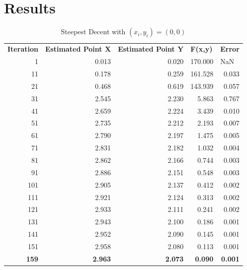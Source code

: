 \documentclass[12pt]{article}
\begin{document}
\section{Results}
\begin{table}[h!]
  \centering
  \caption{Steepest Decent with $(x_i,y_i) = (0,0)$}
    \begin{tabular}{rrrrr}
    \multicolumn{1}{l}{\textbf{Iteration}} & \multicolumn{1}{l}{\textbf{Estimated Point X}} & \multicolumn{1}{l}{\textbf{Estimated Point Y}} & \multicolumn{1}{l}{\textbf{F(x,y)}} & \multicolumn{1}{l}{\textbf{Error}} \\
    1     & 0.013 & 0.020 & 170.000 & \multicolumn{1}{l}{NaN} \\
    11    & 0.178 & 0.259 & 161.528 & 0.033 \\
    21    & 0.468 & 0.619 & 143.939 & 0.057 \\
    31    & 2.545 & 2.230 & 5.863 & 0.767 \\
    41    & 2.659 & 2.224 & 3.439 & 0.010 \\
    51    & 2.735 & 2.212 & 2.193 & 0.007 \\
    61    & 2.790 & 2.197 & 1.475 & 0.005 \\
    71    & 2.831 & 2.182 & 1.032 & 0.004 \\
    81    & 2.862 & 2.166 & 0.744 & 0.003 \\
    91    & 2.886 & 2.151 & 0.548 & 0.003 \\
    101   & 2.905 & 2.137 & 0.412 & 0.002 \\
    111   & 2.921 & 2.124 & 0.313 & 0.002 \\
    121   & 2.933 & 2.111 & 0.241 & 0.002 \\
    131   & 2.943 & 2.100 & 0.186 & 0.001 \\
    141   & 2.952 & 2.090 & 0.145 & 0.001 \\
    151   & 2.958 & 2.080 & 0.113 & 0.001 \\
    \textbf{159} & \textbf{2.963} & \textbf{2.073} & \textbf{0.090} & \textbf{0.001} \\
    \end{tabular}%
  \label{tab:SDM_guess1}%
\end{table}%
\end{document}
